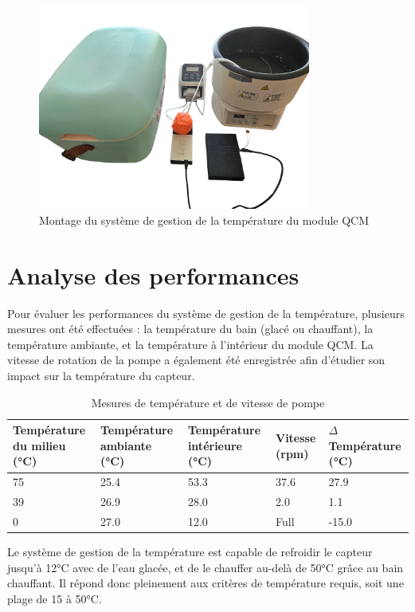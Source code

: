 \begin{figure}[H]
    \centering
    \includegraphics[width=0.8\textwidth]{assets/figures/PhotoMontage.png}
    \caption{Montage du système de gestion de la température du module QCM}
    \label{fig:Photo_Montage}
\end{figure}

\section{Analyse des performances}

Pour évaluer les performances du système de gestion de la température, plusieurs mesures ont été effectuées :  
la température du bain (glacé ou chauffant), la température ambiante, et la température à l’intérieur du module QCM.  
La vitesse de rotation de la pompe a également été enregistrée afin d’étudier son impact sur la température du capteur.

\begin{table}[h!]
\centering
\begin{tabularx}{\textwidth}{|X|X|X|X|X|}
\hline
\textbf{Température du milieu (°C)} & \textbf{Température ambiante (°C)} & \textbf{Température intérieure (°C)} & \textbf{Vitesse (rpm)} & \textbf{$\Delta$ Température (°C)} \\
\hline
75 & 25.4 & 53.3 & 37.6 & 27.9 \\
39 & 26.9 & 28.0 & 2.0 & 1.1  \\
0  & 27.0 & 12.0 & Full & -15.0 \\
\hline
\end{tabularx}
\caption{Mesures de température et de vitesse de pompe}
\end{table}

Le système de gestion de la température est capable de refroidir le capteur jusqu’à 12°C avec de l’eau glacée, et de le chauffer au-delà de 50°C grâce au bain chauffant.  
Il répond donc pleinement aux critères de température requis, soit une plage de 15 à 50°C.